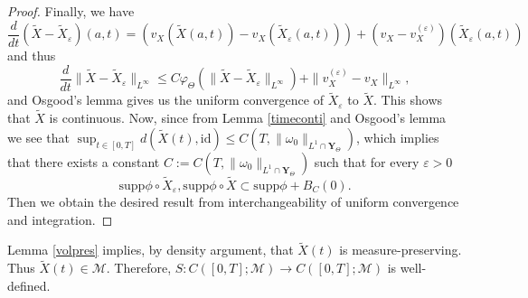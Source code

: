 \documentclass[12pt]{article}
\begin{document}
\begin{proof}
Finally, we have
\begin{equation}
\frac{d}{dt} (\tilde{X} - \tilde{X}_{\varepsilon} ) (a,t) = \left (v_X (\tilde{X} (a,t)) - v_X (\tilde{X}_{\varepsilon} (a,t) ) \right ) + (v_X - v_X^{(\varepsilon)} ) (\tilde{X}_{\varepsilon} (a,t) )
\end{equation}
and thus
\begin{equation}
\frac{d}{dt} \| \tilde{X} - \tilde{X}_{\varepsilon } \|_{L^\infty} \le C \varphi_{\Theta} (\| \tilde{X} - \tilde{X}_{\varepsilon } \|_{L^\infty} ) + \| v_X^{(\varepsilon)} - v_X \|_{L^\infty} ,
\end{equation}
and Osgood's lemma gives us the uniform convergence of $\tilde{X}_{\varepsilon}$ to $\tilde{X}$. This shows that $\tilde{X}$ is continuous. Now, since from Lemma \ref{timeconti} and Osgood's lemma we see that $\sup_{t \in [0, T]} d (\tilde{X} (t), \mathrm{id} ) \le C(T, \| \omega_0 \|_{L^1 \cap \mathbf{Y}_{\Theta} } )$, which implies that there exists a constant $C := C(T, \| \omega_0 \|_{L^1 \cap \mathbf{Y}_{\Theta} } )$ such that for every $\varepsilon>0$
\begin{equation}
\mathrm{supp} \phi \circ \tilde{X}_{\varepsilon}, \mathrm{supp} \phi \circ \tilde{X} \subset \mathrm{supp} \phi + B_{C} (0).
\end{equation}
Then we obtain the desired result from interchangeability of uniform convergence and integration.
\end{proof}
Lemma \ref{volpres} implies, by density argument, that $\tilde{X}(t)$ is measure-preserving. Thus $\tilde{X}(t) \in \mathcal{M}$. Therefore, $S : C([0, T] ; \mathcal{M} ) \rightarrow C([0, T] ; \mathcal{M} )$ is well-defined. 
\end{document}
